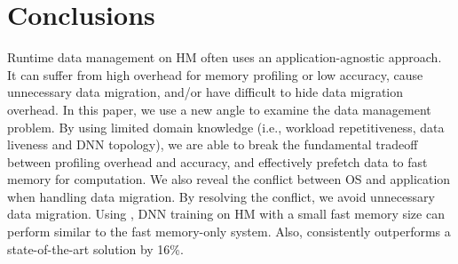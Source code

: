 \vspace{-1pt}
\section{Conclusions}
\vspace{-1pt}
Runtime data management on HM often uses an application-agnostic approach. It can suffer from high overhead for memory profiling or low accuracy, cause unnecessary data migration, and/or have difficult to hide data migration overhead. In this paper, we use a new angle to examine the data management problem. By using limited domain knowledge (i.e., workload repetitiveness, data liveness and DNN topology), we are able to break the fundamental tradeoff between profiling overhead and accuracy, and effectively prefetch data to fast memory for computation. We also reveal the conflict between OS and application when handling data migration. By resolving the conflict, we avoid unnecessary data migration. 
Using \name, DNN training on HM with a small fast memory size can perform similar to the fast memory-only system. Also, \name consistently outperforms a state-of-the-art solution by \textcolor{check}{16\%}.


